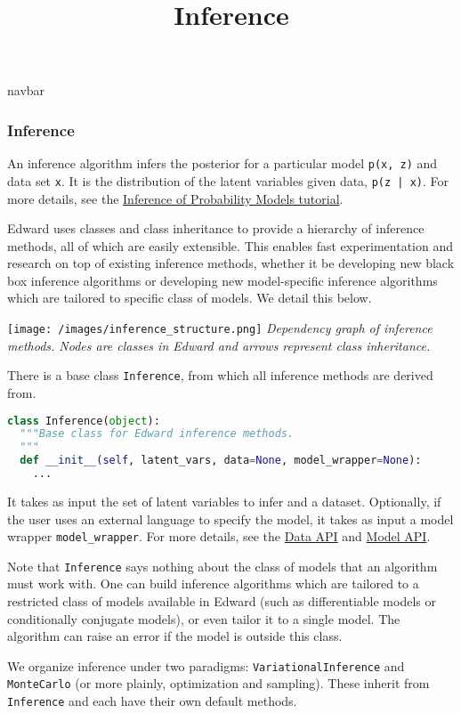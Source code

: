\title{Inference}

{{navbar}}

\subsubsection{Inference}

An inference algorithm infers the posterior for a particular model
\texttt{p(x, z)} and data set \texttt{x}. It is the distribution of the latent
variables given data, \texttt{p(z | x)}. For more details, see the
\href{/tutorials/inference}
{Inference of Probability Models tutorial}.

Edward uses classes and class inheritance to provide a
hierarchy of inference methods, all of which are easily extensible.
This enables fast experimentation and research on top of existing
inference methods, whether it be developing new black box inference
algorithms or developing new model-specific inference algorithms which
are tailored to specific class of models.
We detail this below.

\texttt{[image: /images/inference\_structure.png]}
{\small\textit{Dependency graph of inference methods.
Nodes are classes in Edward and arrows represent class inheritance.}}

There is a base class \texttt{Inference}, from which all inference
methods are derived from.

\begin{lstlisting}[language=Python]
class Inference(object):
  """Base class for Edward inference methods.
  """
  def __init__(self, latent_vars, data=None, model_wrapper=None):
    ...
\end{lstlisting}

It takes as input the set of latent variables to infer and a dataset. Optionally, if the user uses an external language to specify the model, it takes as input a model wrapper \texttt{model_wrapper}.
For more details, see the
\href{/api/data}
{Data API}
and
\href{/api/model}
{Model API}.

Note that \texttt{Inference} says nothing about the class of models that an
algorithm must work with. One can build inference algorithms which are
tailored to a restricted class of models available in Edward (such as
differentiable models or conditionally conjugate models), or even
tailor it to a single model. The algorithm can raise an error if the
model is outside this class.

We organize inference under two paradigms:
\texttt{VariationalInference} and \texttt{MonteCarlo} (or more plainly,
optimization and sampling). These inherit from \texttt{Inference} and each
have their own default methods.

